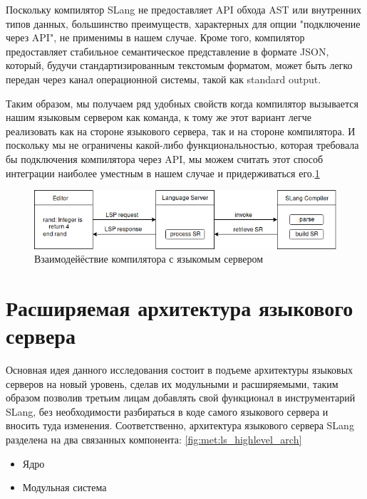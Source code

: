 Поскольку компилятор SLang\cite{Zouev2017} не предоставляет API обхода AST или внутренних типов данных, большинство преимуществ, 
характерных для опции "подключение через API", не применимы в нашем случае. 
Кроме того, компилятор предоставляет стабильное семантическое представление в формате JSON, который, 
будучи стандартизированным текстомым форматом, может быть легко передан через канал операционной системы, такой как standard output\cite{TheOpenGroup1997}.

Таким образом, мы получаем ряд удобных свойств когда компилятор вызывается нашим языковым сервером как команда, к тому же
этот вариант легче реализовать как на стороне языкового сервера, так и на стороне компилятора. 
И поскольку мы не ограничены какой-либо функциональностью, которая требовала бы подключения компилятора через API, 
мы можем считать этот способ интеграции наиболее уместным в нашем случае и придерживаться его.\ref{fig:met:compiler_integration}
\begin{figure}[H]
    \centering
    \includegraphics[width=1.0\textwidth]{figs/compiler_integration.png}
    \caption{Взаимодейёствие компилятора с языкомым сервером}
    \label{fig:met:compiler_integration}
\end{figure}

\section{Расширяемая архитектура языкового сервера}
\label{sec:met:arch}
Основная идея данного исследования состоит в подъеме архитектуры языковых серверов на новый уровень, сделав их модульными и расширяемыми, таким образом позволив третьим лицам добавлять свой функционал в инструментарий SLang, без необходимости разбираться в коде самого языкового сервера и вносить туда изменения.
Соответственно, архитектура языкового сервера SLang разделена на два связанных компонента: \ref{fig:met:ls_highlevel_arch}
\begin{itemize}
    \item Ядро
    \item Модульная система
\end{itemize}

